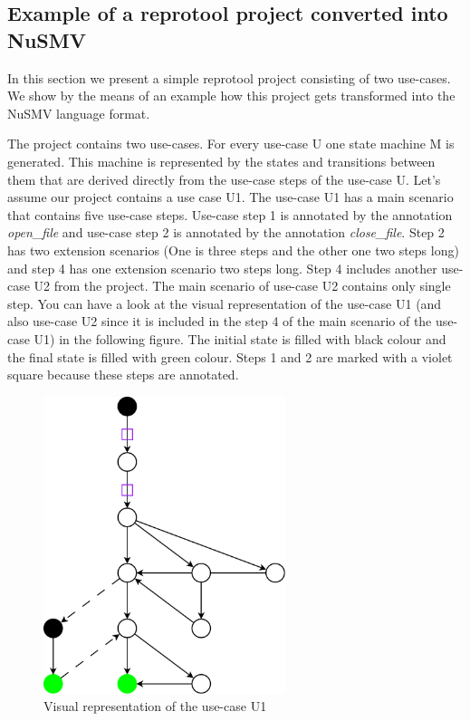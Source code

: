 \subsection{Example of a reprotool project converted into NuSMV}

In this section we present a simple reprotool project consisting of two use-cases. We show by the means of an example how this project
gets transformed into the NuSMV language format.

The project contains two use-cases. For every use-case U one state machine M is generated. This machine is represented by the states and
transitions between them that are derived directly from the use-case steps of the use-case U. Let's assume our project contains a use
case U1. The use-case U1 has a main scenario that contains five use-case steps. Use-case step 1 is annotated by the annotation \emph{open\_file}
and use-case step 2 is annotated by the annotation \emph{close\_file}. Step 2 has two extension scenarios (One is three steps and the other
one two steps long) and step 4 has one extension scenario two steps long. Step 4 includes another use-case U2 from the project. The
main scenario of use-case U2 contains only single step. You can have a look at the visual representation of the use-case U1 (and also
use-case U2 since it is included in the step 4 of the main scenario of the use-case U1) in the following figure. The initial state is
filled with black colour and the final state is filled with green colour. Steps 1 and 2 are marked with a violet square because these
steps are annotated.

\newpage

\begin{figure}[h]
  \centering
  \includegraphics[width=200pt]{images/u1}
  \caption{Visual representation of the use-case U1}
  \label{fig:use-case U1}
\end{figure}

